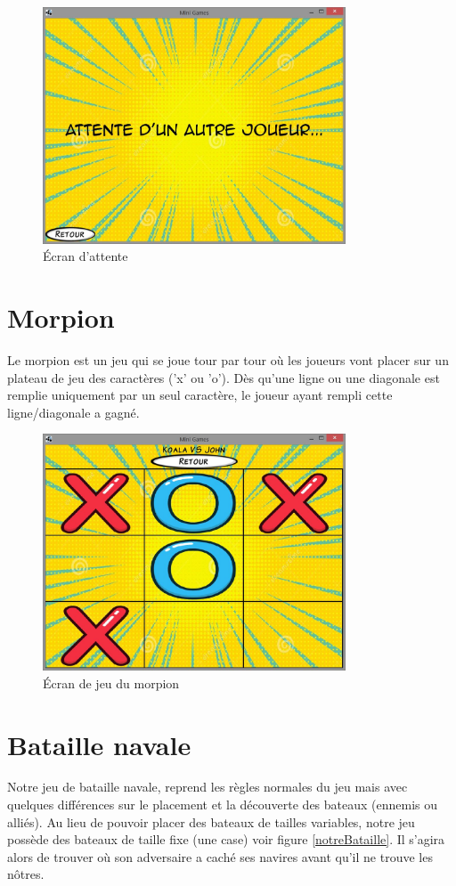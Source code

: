 \documentclass{report}
\begin{document}
\begin{figure}[H]
	\centering\includegraphics[width=9cm]{morpionwaiting}
	\caption{Écran d'attente}
\end{figure}

\chapter{Morpion}
Le morpion est un jeu qui se joue tour par tour où les joueurs vont placer sur un
plateau de jeu des caractères ('x' ou 'o'). Dès qu'une ligne ou une diagonale est remplie uniquement par un seul caractère,
le joueur ayant rempli cette ligne/diagonale a gagné.

\begin{figure}[H]
	\centering\includegraphics[width=9cm]{morpioningame}
	\caption{Écran de jeu du morpion}
\end{figure}


\chapter{Bataille navale}
Notre jeu de bataille navale, reprend les règles normales du jeu mais avec quelques différences sur le placement et la découverte des bateaux (ennemis ou alliés). Au lieu de pouvoir placer
des bateaux de tailles variables, notre jeu possède des bateaux de taille fixe (une case) 
voir figure \ref{notreBataille}. Il s'agira alors de trouver où son adversaire a caché ses navires avant qu'il ne trouve les nôtres.
\end{document}
